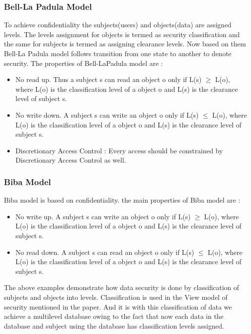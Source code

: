 \documentclass[11pt,a4paper]{report}
\begin{document}
\subsubsection{Bell-La Padula Model}
To achieve confidentiality the subjects(users) and objects(data) are assigned levels. The levels assignment for objects is termed as security classification and the same for subjects is termed as assigning clearance levels. Now based on them Bell-La Padula model follows transition from one state to another to denote security. The properties of Bell-LaPadula model are : 
\begin{itemize}
    \item No read up. Thus a subject s can read an object o only if L(s) $\geq$ L(o), where L(o) is the classification level of a object o and L(s) is the clearance level of subject s.
    \item No write down. A subject s can write an object o only if L(s) $\leq$ L(o), where L(o) is the classification level of a object o and L(s) is the clearance level of subject s.
    \item Discretionary Access Control : Every access should be constrained by Discretionary Access Control as well. 
\end{itemize}
\newpage
\subsubsection{Biba Model}
Biba model is based on confidentiality. the main properties of Biba model are : 
\begin{itemize}
    \item No write up. A subject s can write an object o only if L(s) $\geq$ L(o), where L(o) is the classification level of a object o and L(s) is the clearance level of subject s.
    \item No read down. A subject s can read an object o only if L(s) $\leq$ L(o), where L(o) is the classification level of a object o and L(s) is the clearance level of subject s.
\end{itemize}

The above examples demonstrate how data security is done by classification of subjects and objects into levels. Classification is used in the View model of security mentioned in the paper. And it is with this classification of data we achieve a multilevel database owing to the fact that now each data in the database and subject using the database has classification levels assigned. \\ 
\end{document}
